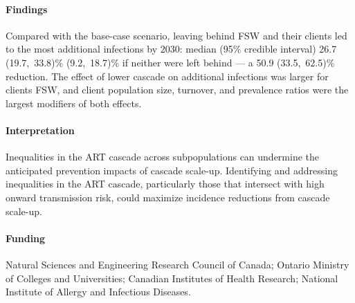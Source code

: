 \paragraph{Findings}
Compared with the base-case scenario, leaving behind FSW and their clients
led to the most additional infections by 2030: median (95\% credible interval)
26.7 (19.7,~33.8)\%  (9.2,~18.7)\% if neither were left behind
--- a 50.9 (33.5,~62.5)\% reduction.
The effect of lower cascade on additional infections was larger for clients \vs FSW, and
client population size, turnover, and prevalence ratios were the largest modifiers of both effects.
\paragraph{Interpretation}
Inequalities in the ART cascade across subpopulations
can undermine the anticipated prevention impacts of cascade scale-up.
Identifying and addressing inequalities in the ART cascade,
particularly those that intersect with high onward transmission risk,
could maximize incidence reductions from cascade scale-up.
\paragraph{Funding}
Natural Sciences and Engineering Research Council of Canada;
Ontario Ministry of Colleges and Universities;
Canadian Institutes of Health Research;
National Institute of Allergy and Infectious Diseases.
